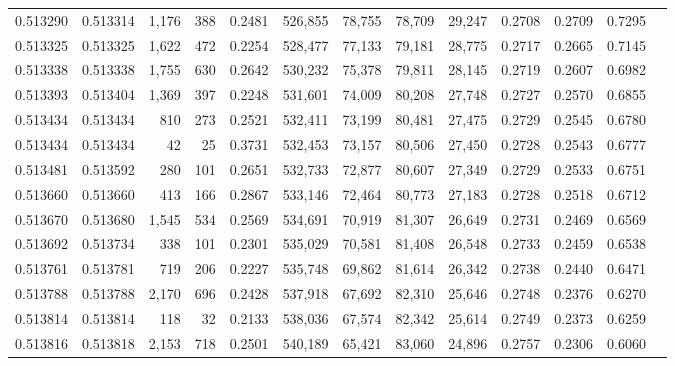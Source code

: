 \begin{tabular}{rrrrrrrrrrrrr}
0.513290 & 0.513314 & 1,176 &   388 &                                     0.2481 & 526,855 &  78,755 &  78,709 &  29,247 & 0.2708 & 0.2709 & 0.7295 \\
0.513325 & 0.513325 & 1,622 &   472 &                                     0.2254 & 528,477 &  77,133 &  79,181 &  28,775 & 0.2717 & 0.2665 & 0.7145 \\
0.513338 & 0.513338 & 1,755 &   630 &                                     0.2642 & 530,232 &  75,378 &  79,811 &  28,145 & 0.2719 & 0.2607 & 0.6982 \\
0.513393 & 0.513404 & 1,369 &   397 &                                     0.2248 & 531,601 &  74,009 &  80,208 &  27,748 & 0.2727 & 0.2570 & 0.6855 \\
0.513434 & 0.513434 &   810 &   273 &                                     0.2521 & 532,411 &  73,199 &  80,481 &  27,475 & 0.2729 & 0.2545 & 0.6780 \\
0.513434 & 0.513434 &    42 &    25 &                                     0.3731 & 532,453 &  73,157 &  80,506 &  27,450 & 0.2728 & 0.2543 & 0.6777 \\
0.513481 & 0.513592 &   280 &   101 &                                     0.2651 & 532,733 &  72,877 &  80,607 &  27,349 & 0.2729 & 0.2533 & 0.6751 \\
0.513660 & 0.513660 &   413 &   166 &                                     0.2867 & 533,146 &  72,464 &  80,773 &  27,183 & 0.2728 & 0.2518 & 0.6712 \\
0.513670 & 0.513680 & 1,545 &   534 &                                     0.2569 & 534,691 &  70,919 &  81,307 &  26,649 & 0.2731 & 0.2469 & 0.6569 \\
0.513692 & 0.513734 &   338 &   101 &                                     0.2301 & 535,029 &  70,581 &  81,408 &  26,548 & 0.2733 & 0.2459 & 0.6538 \\
0.513761 & 0.513781 &   719 &   206 &                                     0.2227 & 535,748 &  69,862 &  81,614 &  26,342 & 0.2738 & 0.2440 & 0.6471 \\
0.513788 & 0.513788 & 2,170 &   696 &                                     0.2428 & 537,918 &  67,692 &  82,310 &  25,646 & 0.2748 & 0.2376 & 0.6270 \\
0.513814 & 0.513814 &   118 &    32 &                                     0.2133 & 538,036 &  67,574 &  82,342 &  25,614 & 0.2749 & 0.2373 & 0.6259 \\
0.513816 & 0.513818 & 2,153 &   718 &                                     0.2501 & 540,189 &  65,421 &  83,060 &  24,896 & 0.2757 & 0.2306 & 0.6060 \\

\end{tabular}
